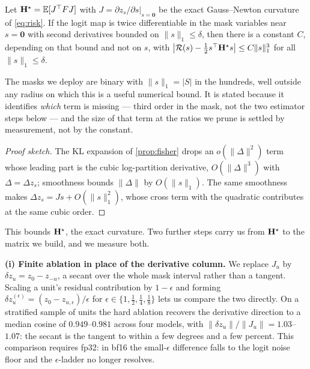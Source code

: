 \begin{proposition}\label{prop:additivity}
Let $\mathbf{H}^\star=\mathbb{E}[J^\top F J]$ with $J=\partial z_s/\partial s|_{s=\mathbf 0}$ be the exact
Gauss--Newton curvature of \cref{eq:risk}. If the logit map is twice differentiable in the mask
variables near $s=\mathbf 0$ with second derivatives bounded on $\|s\|_1\le\delta$, then there is a
constant $C$, depending on that bound and not on $s$, with
$\big|\mathcal{R}(s)-\tfrac12 s^\top\mathbf{H}^\star s\big|\le C\|s\|_1^3$ for all $\|s\|_1\le\delta$.
\end{proposition}
\noindent The masks we deploy are binary with $\|s\|_1=|S|$ in the hundreds, well outside any radius
on which this is a useful numerical bound. It is stated because it identifies \emph{which} term is
missing --- third order in the mask, not the two estimator steps below --- and the size of that term at
the ratios we prune is settled by measurement, not by the constant.
\begin{proof}[Proof sketch]
The KL expansion of \cref{prop:fisher} drops an $o(\|\Delta\|^2)$ term whose leading part is the cubic
log-partition derivative, $O(\|\Delta\|^3)$ with $\Delta=\Delta z_s$; smoothness bounds $\|\Delta\|$ by
$O(\|s\|_1)$. The same smoothness makes $\Delta z_s=Js+O(\|s\|_1^2)$, whose cross term with the
quadratic contributes at the same cubic order.
\end{proof}

\noindent This bounds $\mathbf{H}^\star$, the exact curvature. Two further steps carry us from
$\mathbf{H}^\star$ to the matrix we build, and we measure both.

\textbf{(i) Finite ablation in place of the derivative column.} We replace $J_u$ by
$\delta z_u=z_0-z_{-u}$, a secant over the whole mask interval rather than a tangent. Scaling a unit's
residual contribution by $1-\epsilon$ and forming $\delta z_u^{(\epsilon)}=(z_0-z_{u,\epsilon})/\epsilon$
for $\epsilon\in\{1,\tfrac12,\tfrac14,\tfrac18\}$ lets us compare the two directly. On a stratified
sample of units the hard ablation recovers the derivative direction to a median cosine of
$0.949$--$0.981$ across four models, with $\|\delta z_u\|/\|J_u\|=1.03$--$1.07$: the secant is the
tangent to within a few degrees and a few percent. This comparison requires fp32: in bf16 the small-$\epsilon$ difference falls to the logit noise
floor and the $\epsilon$-ladder no longer resolves.

